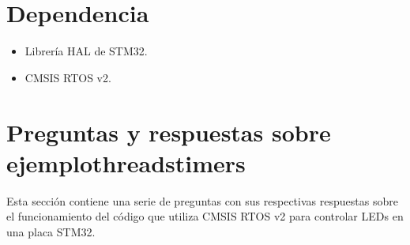 \documentclass[letterpaper,10pt,english]{sphinxmanual}
\begin{document}
\begin{sphinxVerbatim}[commandchars=\\\{\},numbers=left,firstnumber=1,stepnumber=1]







\end{sphinxVerbatim}
\sphinxresetverbatimhllines


\section{Dependencia}
\label{\detokenize{ejemplothreads-software-timers:dependencia}}\begin{itemize}
\item {} 
\sphinxAtStartPar
Librería HAL de STM32.

\item {} 
\sphinxAtStartPar
CMSIS RTOS v2.

\end{itemize}


\section{Preguntas y respuestas sobre ejemplothreads\sphinxhyphen{}timers}
\label{\detokenize{ejemplothreads-software-timers:preguntas-y-respuestas-sobre-ejemplothreads-timers}}
\sphinxAtStartPar
Esta sección contiene una serie de preguntas con sus respectivas respuestas sobre el funcionamiento del código que utiliza CMSIS RTOS v2 para controlar LEDs en una placa STM32.
\end{document}
